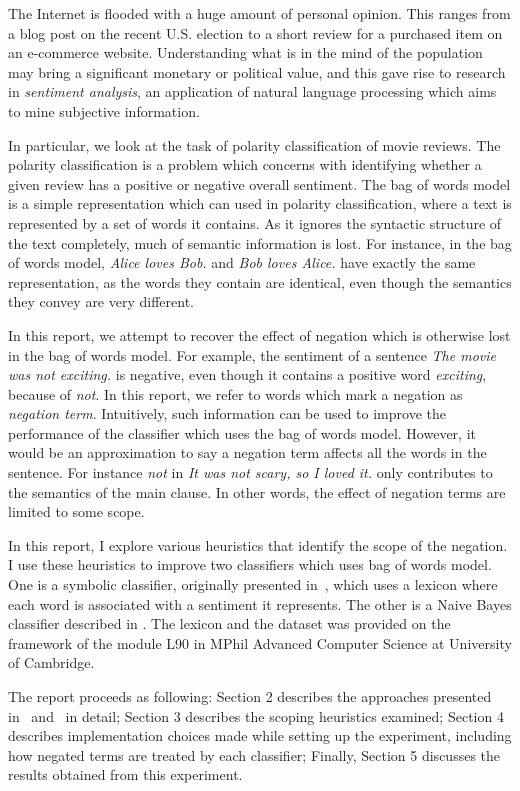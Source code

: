 The Internet is flooded with a huge amount of personal opinion. This ranges from a blog post on the recent U.S. election to a short review for a purchased item on an e-commerce website. Understanding what is in the mind of the population may bring a significant monetary or political value, and this gave rise to research in {\em sentiment analysis}, an application of natural language processing which aims to mine subjective information.

In particular, we look at the task of polarity classification of movie reviews. The polarity classification is a problem which concerns with identifying whether a given review has a positive or negative overall sentiment. The bag of words model is a simple representation which can used in polarity classification, where a text is represented by a set of words it contains. As it ignores the syntactic structure of the text completely, much of semantic information is lost. For instance, in the bag of words model, \textit{Alice loves Bob.} and \textit{Bob loves Alice.} have exactly the same representation, as the words they contain are identical, even though the semantics they convey are very different.

In this report, we attempt to recover the effect of negation which is otherwise lost in the bag of words model. For example, the sentiment of a sentence \textit{The movie was not exciting.} is negative, even though it contains a positive word \textit{exciting}, because of  \textit{not}. In this report, we refer to words which mark a negation as \emph{negation term}. Intuitively, such information can be used to improve the performance of the classifier which uses the bag of words model. However, it would be an approximation to say a negation term affects all the words in the sentence. For instance \textit{not} in \textit{It was not scary, so I loved it.} only contributes to the semantics of the main clause. In other words, the effect of negation terms are limited to some scope.

In this report, I explore various heuristics that identify the scope of the negation. I use these heuristics to improve two classifiers which uses bag of words model. One is a symbolic classifier, originally presented in~\citep{wilson2005recognizing}, which uses a lexicon where each word is associated with a sentiment it represents. The other is a Naive Bayes classifier described in \cite{pang2002thumbs}. The lexicon and the dataset was provided on the framework of the module L90 in MPhil Advanced Computer Science at University of Cambridge.

The report proceeds as following: Section 2 describes the approaches presented in~\citep{wilson2005recognizing} and~\citep{pang2002thumbs} in detail; Section 3 describes the scoping heuristics examined; Section 4 describes implementation choices made while setting up the experiment, including how negated terms are treated by each classifier; Finally, Section 5 discusses the results obtained from this experiment.

